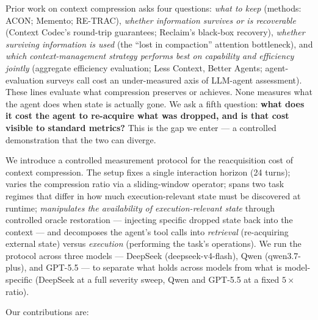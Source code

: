 \documentclass[11pt]{article}
\begin{document}
Prior work on context compression asks four questions: \emph{what to keep} (methods: ACON;
Memento; RE-TRAC), \emph{whether information survives or is recoverable} (Context Codec's
round-trip guarantees; Reclaim's black-box recovery), \emph{whether surviving information is
used} (the ``lost in compaction'' attention bottleneck), and \emph{which context-management
strategy performs best on capability and efficiency jointly} (aggregate efficiency
evaluation; Less Context, Better Agents; agent-evaluation surveys call cost an
under-measured axis of LLM-agent assessment). These lines evaluate what compression
preserves or achieves. None measures what the agent does when state is actually gone.
We ask a fifth question: \textbf{what does it cost the agent to re-acquire what was dropped,
and is that cost visible to standard metrics?} This is the gap we enter --- a controlled
demonstration that the two can diverge.

We introduce a controlled measurement protocol for the reacquisition cost of context
compression. The setup fixes a single interaction horizon (24 turns); varies the
compression ratio via a sliding-window operator; spans two task regimes that differ in
how much execution-relevant state must be discovered at runtime; \emph{manipulates the
availability of execution-relevant state} through controlled oracle restoration ---
injecting specific dropped state back into the context --- and decomposes the agent's tool
calls into \emph{retrieval} (re-acquiring external state) versus \emph{execution} (performing the
task's operations). We run the protocol across three models --- DeepSeek (deepseek-v4-flash), Qwen
(qwen3.7-plus), and GPT-5.5 --- to separate what holds across models from what is model-specific (DeepSeek at
a full severity sweep, Qwen and GPT-5.5 at a fixed $5\times$ ratio).

Our contributions are:
\end{document}
